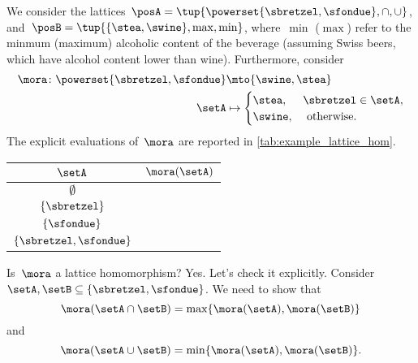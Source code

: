 \begin{example}
	We consider the lattices~$\posA=\tup{\powerset \{\sbretzel,\sfondue\}, \cap, \cup}$, and~$\posB=\tup{\{\stea, \swine\}, \max, \min}$, where~$\min$ ($\max$) refer to the minmum (maximum) alcoholic content of the beverage (assuming Swiss beers, which have alcohol content lower than wine).
	Furthermore, consider
	\begin{equation}
		\label{eq:example_lat_hom_a}
		\begin{aligned}
			\mora\colon \powerset \{\sbretzel,\sfondue\} & \mto \{\swine, \stea\}            \\
			\setA                                        & \mapsto \begin{cases}
				\stea,  & \sbretzel \in \setA, \\
				\swine, & \text{ otherwise}.
			\end{cases}
		\end{aligned}
	\end{equation}
	The explicit evaluations of~$\mora$ are reported in \cref{tab:example_lattice_hom}.
	\begin{margintable}
		\begin{center}
			\begin{tabular}{c|c}
				$\setA$                    & $\mora(\setA)$ \\
				\midrule
				$\emptyset$                & \swine         \\
				$\{\sbretzel\}$            & \stea          \\
				$\{\sfondue\}$             & \swine         \\
				$\{ \sbretzel, \sfondue\}$ & \stea
			\end{tabular}
		\end{center}
		\caption{\label{tab:example_lattice_hom}}
	\end{margintable}

	Is~$\mora$ a lattice homomorphism?
	Yes.
	Let's check it explicitly.
	Consider~$\setA,\setB\subseteq \{\sbretzel, \sfondue\}$.
	We need to show that
	\begin{equation}
		\label{eq:hom_lat_cond_a}
		\mora(\setA\cap \setB)=\max\{\mora(\setA),\mora(\setB)\}\\
	\end{equation}
	and
	\begin{equation}
		\label{eq:hom_lat_cond_b}
		\mora(\setA\cup \setB)=\min\{\mora(\setA),\mora(\setB)\}.
	\end{equation}


\end{example}
